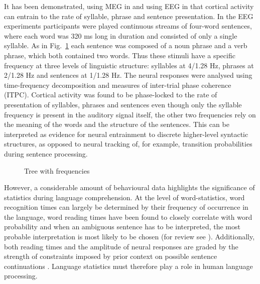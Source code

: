 \documentclass[a4paper,10pt,twoside]{article}
\begin{document}
It has been demonstrated, using MEG in \cite{DingEtAl2016} and using
EEG in \cite{DingEtAl2017} that cortical activity can entrain to the
rate of syllable, phrase and sentence presentation. In the EEG
experiments participants were played continuous streams of four-word
sentences, where each word was 320 ms long in duration and consisted
of only a single syllable. As in Fig.~\ref{fig:freq_tree} each
sentence was composed of a noun phrase and a verb phrase, which both
contained two words. Thus these stimuli have a specific frequency at
three levels of linguistic structure: syllables at 4/1.28 Hz, phrases
at 2/1.28 Hz and sentences at 1/1.28 Hz. The neural responses were
analysed using time-frequency decomposition and measures of
inter-trial phase coherence (ITPC). Cortical activity was found to be
phase-locked to the rate of presentation of syllables, phrases and
sentences even though only the syllable frequency is present in the
auditory signal itself, the other two frequencies rely on the meaning
of the words and the structure of the sentences.  This can be
interpreted as evidence for neural entrainment to discrete
higher-level syntactic structures, as opposed to neural tracking of,
for example, transition probabilities during sentence processing.

\begin{figure}[tb]
\begin{center}
\end{center}
\caption{Tree with frequencies \label{fig:freq_tree}}
\end{figure}

However, a considerable amount of behavioural data highlights the
significance of statistics during language comprehension. At the level
of word-statistics, word recognition times can largely be determined
by their frequency of occurrence in the language, word reading times
have been found to closely correlate with word probability and when an
ambiguous sentence has to be interpreted, the most probable
interpretation is most likely to be chosen (for review see
\cite{Jurafsky2002}). Additionally, both reading times and the
amplitude of neural responses are graded by the strength of
constraints imposed by prior context on possible sentence
continuations \cite{GibsonPearlmutter1998}. Language statistics must
therefore play a role in human language processing.
\end{document}
